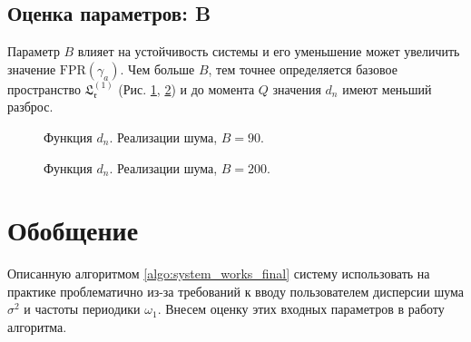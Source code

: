 \documentclass[specialist, substylefile = spbu.rtx,
			   subf, href, 12pt]{disser}
\begin{document}
\newpage
\subsection{Оценка параметров: B}
Параметр $ B $ влияет на устойчивость системы и его уменьшение может увеличить значение $ \mathrm{FPR}(\gamma_a) $. Чем больше $ B $, тем точнее определяется базовое пространство $ \mathfrak{L_r^{(1)}} $ (Рис. \ref{pic:row_diff_small_B}, \ref{pic:row_diff_big_B}) и до момента $ Q $ значения $ d_n $ имеют меньший разброс.
\begin{figure}[!hhh]
	\caption{Функция $ d_n $. Реализации шума, $ B=90 $.}
	\label{pic:row_diff_small_B}
\end{figure}

\begin{figure}[!hhh]
	\caption{Функция $ d_n $. Реализации шума, $ B=200 $.}
	\label{pic:row_diff_big_B}
\end{figure}

\section{Обобщение}\label{sec:generalization}
Описанную алгоритмом \ref{algo:system_works_final} систему использовать на практике проблематично из-за требований к вводу пользователем дисперсии шума $ \sigma^2 $ и частоты периодики $ \omega_1 $. Внесем оценку этих входных параметров в работу алгоритма.
\end{document}
